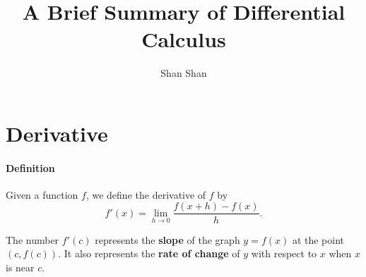 \documentclass[10pt,twoside]{article}
\title{A Brief Summary of Differential Calculus}
\author{Shan Shan}
\newcommand{\defn}{\paragraph*{Definition}}
\begin{document}
\maketitle

\section{Derivative}
\defn Given a function $f$, we define the derivative of $f$ by 
$$ f'(x) = \lim_{h \rightarrow 0} \frac{f(x+h)-f(x)}{h}. $$

The number $f'(c)$ represents the {\bf slope} of the graph $ y = f(x)$ at the point $(c, f(c))$. It also represents the {\bf rate of change} of $y$ with respect to $x$ when $x$ is near $c$. 
\end{document}
